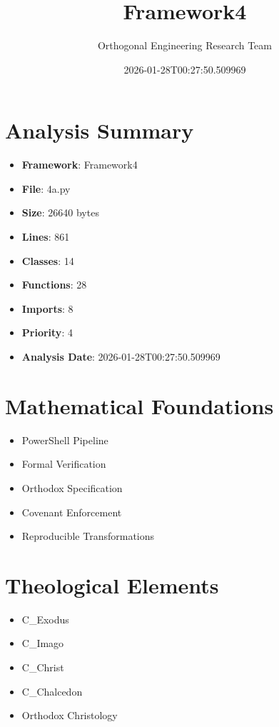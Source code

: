 \documentclass[12pt]{article}
\title{Framework4}
\author{Orthogonal Engineering Research Team}
\date{2026-01-28T00:27:50.509969}
\begin{document}
\maketitle

\section{Analysis Summary}

\begin{itemize}
    \item \textbf{Framework}: Framework4
    \item \textbf{File}: 4a.py
    \item \textbf{Size}: 26640 bytes
    \item \textbf{Lines}: 861
    \item \textbf{Classes}: 14
    \item \textbf{Functions}: 28
    \item \textbf{Imports}: 8
    \item \textbf{Priority}: 4
    \item \textbf{Analysis Date}: 2026-01-28T00:27:50.509969
\end{itemize}

\section{Mathematical Foundations}

\begin{itemize}
    \item PowerShell Pipeline
    \item Formal Verification
    \item Orthodox Specification
    \item Covenant Enforcement
    \item Reproducible Transformations
\end{itemize}

\section{Theological Elements}

\begin{itemize}
    \item C_Exodus
    \item C_Imago
    \item C_Christ
    \item C_Chalcedon
    \item Orthodox Christology
\end{itemize}
\end{document}
